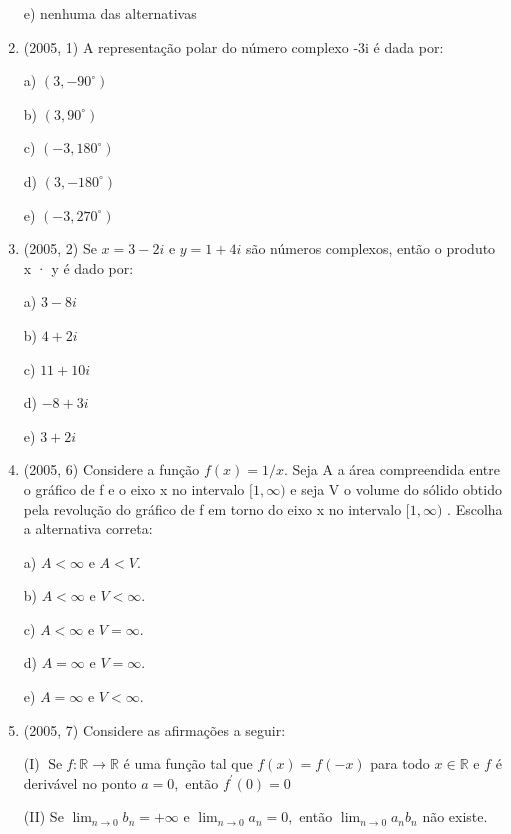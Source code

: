 \documentclass{article}
\begin{document}
\begin{enumerate}
e) nenhuma das alternativas\newline







\item(2005, 1) A representação polar do número complexo -3i é dada por:

a) $\left(3,-90^{\circ}\right)$

b) $\left(3,90^{\circ}\right)$

c) $\left(-3,180^{\circ}\right)$

d) $\left(3,-180^{\circ}\right)$

e) $\left(-3,270^{\circ}\right)$ \newline




\item(2005, 2) Se $x=3-2 i$ e $y=1+4 i$ são números complexos, então o produto x · y é dado por:

a) $3-8 i$

b) $4+2 i$

c) $11+10 i$

d) $-8+3 i$

e) $3+2 i$\newline





\item(2005, 6) Considere a função $f(x)=1 / x$. Seja A a área compreendida entre o gráfico de f e o eixo x no intervalo $[1, \infty)$ e seja V o volume do sólido obtido pela revolução do gráfico de f em torno do eixo x no intervalo $[1, \infty)$ . Escolha a alternativa correta:

a) $A<\infty$ e $A<V$.

b) $A<\infty$ e $V<\infty$.

c) $A<\infty$ e $V=\infty$.

d) $A=\infty$ e $V=\infty$.

e) $A=\infty$ e $V<\infty$.\newline


\item(2005, 7) Considere as afirmações a seguir:

(I) $\operatorname{Se} f : \mathbb{R} \longrightarrow \mathbb{R}$ é uma função tal que $f(x)=f(-x)$ para todo $x \in \mathbb{R}$ e $f$ é derivável no ponto $a=0,$ então $f^{\prime}(0)=0$

(II) Se $\lim _{n \rightarrow 0} b_{n}=+\infty$ e $\lim _{n \rightarrow 0} a_{n}=0,$ então $\lim _{n \rightarrow 0} a_{n} b_{n}$ não existe.


\end{enumerate}
\end{document}
